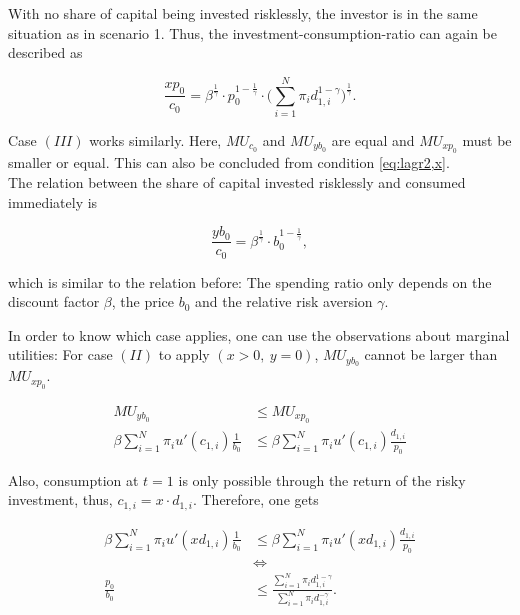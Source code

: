 \noindent With no share of capital being invested risklessly, the investor is in the same situation as in scenario 1. Thus, the investment-consumption-ratio can again be described as

\begin{equation}
    \frac{xp_0}{c_0} = \beta^{\frac{1}{\gamma}} \cdot p_0^{1-\frac{1}{\gamma}} \cdot \bigg( \sum_{i=1}^{N} \pi_i d_{1,i}^{1-\gamma} \bigg)^{\frac{1}{\gamma}}.
\end{equation}

\bigskip

\noindent Case $(III)$ works similarly. Here, $MU_{c_0}$ and $MU_{yb_0}$ are equal and $MU_{xp_0}$ must be smaller or equal. This can also be concluded from condition \eqref{eq:lagr2,x}.\\
The relation between the share of capital invested risklessly and consumed immediately is

\begin{equation}
    \frac{yb_0}{c_0} = \beta^{\frac{1}{\gamma}} \cdot b_0^{1-\frac{1}{\gamma}},
\end{equation}

\bigskip

\noindent which is similar to the relation before: The spending ratio only depends on the discount factor $\beta$, the price $b_0$ and the relative risk aversion $\gamma$.

\bigskip

\noindent In order to know which case applies, one can use the observations about marginal utilities: For case $(II)$ to apply $(x > 0,\ y = 0)$, $MU_{yb_0}$ cannot be larger than $MU_{xp_0}$.

\begin{equation*}
\begin{split}
    MU_{yb_0} &\leq MU_{xp_0}\\
    \beta \sum_{i=1}^{N} \pi_i u'(c_{1,i}) \frac{1}{b_0} &\leq \beta \sum_{i=1}^{N} \pi_i u'(c_{1,i}) \frac{d_{1,i}}{p_0}
\end{split}
\end{equation*}

\bigskip

\noindent Also, consumption at $t=1$ is only possible through the return of the risky investment, thus, $c_{1,i} = x \cdot d_{1,i}$. Therefore, one gets

\begin{equation}\label{eq:2xp0b0,y0}
\begin{split}
    \beta \sum_{i=1}^{N} \pi_i u'(xd_{1,i}) \frac{1}{b_0} &\leq \beta \sum_{i=1}^{N} \pi_i u'(xd_{1,i}) \frac{d_{1,i}}{p_0}\\
    &\Leftrightarrow\\
    \frac{p_0}{b_0} &\leq \frac{\sum_{i=1}^{N} \pi_i d_{1,i}^{1-\gamma}}{\sum_{i=1}^{N} \pi_i d_{1,i}^{-\gamma}}.
\end{split}
\end{equation}


